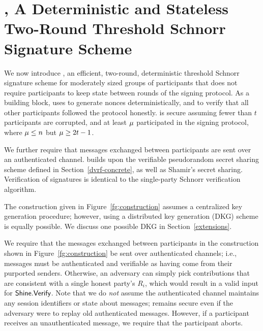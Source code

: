 \section{\glitter, A Deterministic and Stateless Two-Round Threshold Schnorr Signature Scheme}

We now introduce \glitter,
an efficient,  two-round, deterministic threshold Schnorr signature scheme for moderately sized groups of participants that does not require participants to keep state between rounds of the signing protocol.
As a building block,
\glitter uses \DVRFOne to generate nonces deterministically,
and to verify that all other participants followed the protocol honestly.
\glitter is secure assuming fewer than $t$ participants are corrupted,
and at least $\mu$ participated in the signing protocol,
where $\mu \leq n$ but  $\mu \geq 2t-1$.

We further require that messages exchanged between participants are sent over an authenticated channel.
\glitter builds upon the verifiable pseudorandom secret sharing scheme \DVRFOne defined in Section~\ref{dvrf-concrete},
as well as Shamir's secret sharing.
Verification of signatures is identical to the single-party Schnorr verification algorithm.

\begin{remark}
The \glitter construction given in Figure~\ref{fg:construction} assumes a centralized key generation procedure;
however,
using a distributed key generation (DKG) scheme is equally possible.
We discuss one possible DKG in Section~\ref{extensions}.
\end{remark}

\begin{remark}
  \label{remark:auth-channel}
  We require that the messages exchanged between participants in the \glitter construction shown in Figure~\ref{fg:construction} be sent over authenticated channels;
  i.e., messages must be authenticated and verifiable as having come from their purported senders.
  Otherwise,
  an adversary can simply pick contributions that are consistent with a single honest party's $R_i$,
  which would result in a valid input for $\mathsf{Shine}.\mathsf{Verify}$.
  Note that we do \emph{not} assume the authenticated channel maintains any session identifiers or state about messages;
  \glitter remains secure even if the adversary were to replay old authenticated messages.
%
  However, if a participant receives an unauthenticated message,
  we require that the participant aborts.
\end{remark}

